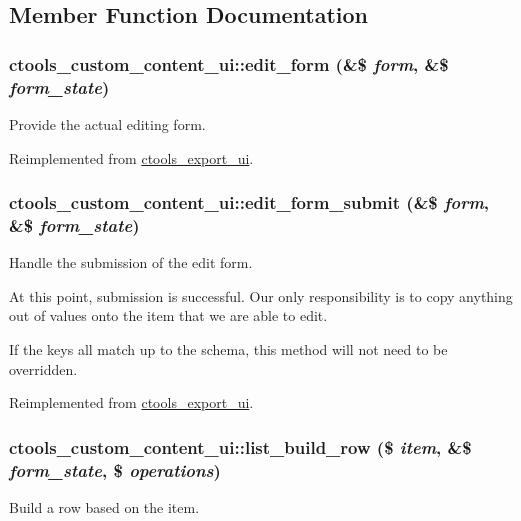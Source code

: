 \subsection{Member Function Documentation}
\hypertarget{classctools__custom__content__ui_ab0aa3104e4e701edbf82939f4d07b866}{
\subsubsection[{edit\_\-form}]{\setlength{\rightskip}{0pt plus 5cm}ctools\_\-custom\_\-content\_\-ui::edit\_\-form (\&\$ {\em form}, \/  \&\$ {\em form\_\-state})}}
\label{classctools__custom__content__ui_ab0aa3104e4e701edbf82939f4d07b866}
Provide the actual editing form. 

Reimplemented from \hyperlink{classctools__export__ui_a183bc5e2bb1c4c48aedbd1754c5a0058}{ctools\_\-export\_\-ui}.\hypertarget{classctools__custom__content__ui_a77ac2a98884dcc134470d1e28e01246e}{
\subsubsection[{edit\_\-form\_\-submit}]{\setlength{\rightskip}{0pt plus 5cm}ctools\_\-custom\_\-content\_\-ui::edit\_\-form\_\-submit (\&\$ {\em form}, \/  \&\$ {\em form\_\-state})}}
\label{classctools__custom__content__ui_a77ac2a98884dcc134470d1e28e01246e}
Handle the submission of the edit form.

At this point, submission is successful. Our only responsibility is to copy anything out of values onto the item that we are able to edit.

If the keys all match up to the schema, this method will not need to be overridden. 

Reimplemented from \hyperlink{classctools__export__ui_ad63b402977462073eade789265987139}{ctools\_\-export\_\-ui}.\hypertarget{classctools__custom__content__ui_a56ee3ac6704a7d3736da6d9cc6b229d4}{
\subsubsection[{list\_\-build\_\-row}]{\setlength{\rightskip}{0pt plus 5cm}ctools\_\-custom\_\-content\_\-ui::list\_\-build\_\-row (\$ {\em item}, \/  \&\$ {\em form\_\-state}, \/  \$ {\em operations})}}
\label{classctools__custom__content__ui_a56ee3ac6704a7d3736da6d9cc6b229d4}
Build a row based on the item.

